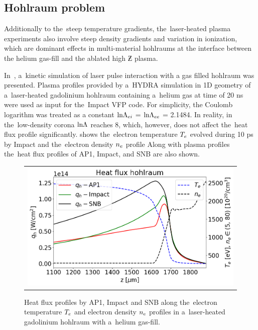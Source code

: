 \subsection{Hohlraum problem}
Additionally to the~steep temperature gradients, the~laser-heated plasma 
experiments also involve steep density gradients and variation in ionization,
which are dominant effects in multi-material hohlraums
at the interface between the helium gas-fill and 
the ablated high $\Zbar$ plasma.

In~\cite{Brodrick_PoP2017}, a~kinetic simulation of laser pulse interaction 
with a gas filled hohlraum was presented. 
Plasma profiles provided by a~HYDRA simulation in 1D
geometry of a~laser-heated gadolinium hohlraum containing a~helium 
gas at time of 20 ns were used as input for the~Impact 
\cite{Kingham_JCP2004} VFP code.  
For simplicity, the Coulomb logarithm was treated as a
constant $\text{ln}\Lambda_{ei}$ = $\text{ln}\Lambda_{ee}$ = 2.1484. In reality, in the~low-density 
corona $\text{ln}\Lambda$ reaches 8, which, however, does not affect the~heat flux profile 
significantly. 
 shows the~electron temperature $T_e$ 
evolved during 10 ps by Impact and the~electron density $n_e$ profile
Along with plasma profiles the~heat flux profiles
of AP1, Impact, and SNB are also shown. 

\begin{figure}[htb]
  \begin{center}
    \begin{tabular}{c}
      \includegraphics[width=\figscale\textwidth]{../VFPdata/C7_GdHohlraum_heatflux.png}
    \end{tabular}
  \caption{
  Heat flux profiles by AP1, Impact and SNB along 
  the~electron temperature $T_e$ and electron density $n_e$
  profiles in a~laser-heated gadolinium hohlraum 
  with a~helium gas-fill.
  }
  \label{fig:Gd_VFP_10ps_heatflux}
  \end{center} 
\end{figure}

